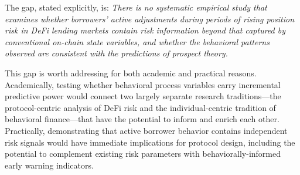 The gap, stated explicitly, is: \emph{There is no systematic empirical study that examines whether borrowers' active adjustments during periods of rising position risk in DeFi lending markets contain risk information beyond that captured by conventional on-chain state variables, and whether the behavioral patterns observed are consistent with the predictions of prospect theory.}

This gap is worth addressing for both academic and practical reasons. Academically, testing whether behavioral process variables carry incremental predictive power would connect two largely separate research traditions—the protocol-centric analysis of DeFi risk and the individual-centric tradition of behavioral finance—that have the potential to inform and enrich each other. Practically, demonstrating that active borrower behavior contains independent risk signals would have immediate implications for protocol design, including the potential to complement existing risk parameters with behaviorally-informed early warning indicators.
